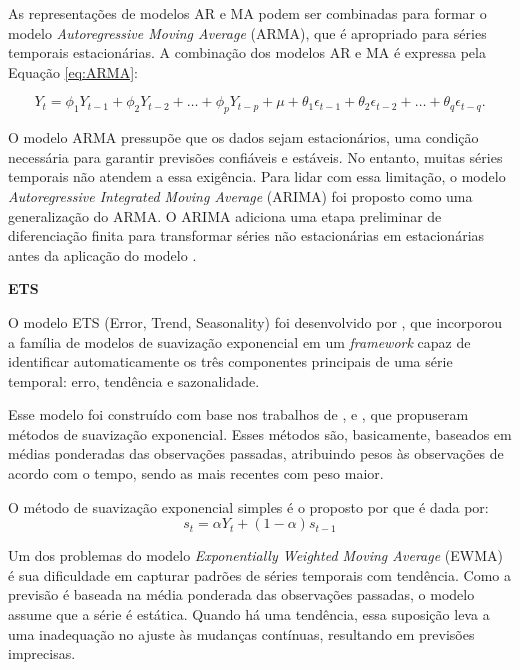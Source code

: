 As representações de modelos AR e MA podem ser combinadas para formar o modelo \textit{Autoregressive Moving Average} (ARMA), que é apropriado para séries temporais estacionárias. A combinação dos modelos AR e MA é expressa pela Equação \eqref{eq:ARMA}:

\begin{equation}
Y_t = \phi_1 Y_{t-1} + \phi_2 Y_{t-2} + \dots + \phi_p Y_{t-p} +  \mu  + \theta_1 \epsilon_{t-1} + \theta_2 \epsilon_{t-2} + \dots + \theta_q \epsilon_{t-q}.
\label{eq:ARMA}
\end{equation}

O modelo ARMA pressupõe que os dados sejam estacionários, uma condição necessária para garantir previsões confiáveis e estáveis. No entanto, muitas séries temporais não atendem a essa exigência. Para lidar com essa limitação, o modelo \textit{Autoregressive Integrated Moving Average} (ARIMA) foi proposto como uma generalização do ARMA. O ARIMA adiciona uma etapa preliminar de diferenciação finita para transformar séries não estacionárias em estacionárias antes da aplicação do modelo \citep{ratnadip2013}.

\textbf{ETS}

O modelo ETS (Error, Trend, Seasonality) foi desenvolvido por \cite{hyndmanETS2008}, que incorporou a família de modelos de suavização exponencial em um \textit{framework} capaz de identificar automaticamente os três componentes principais de uma série temporal: erro, tendência e sazonalidade.

Esse modelo foi construído com base nos trabalhos de \cite{brownETS}, \cite{holtETS} e \cite{wintersETS}, que propuseram métodos de suavização exponencial. Esses métodos são, basicamente, baseados em médias ponderadas das observações passadas, atribuindo pesos às observações de acordo com o tempo, sendo as mais recentes com peso maior.

O método de suavização exponencial simples é o proposto por \cite{brownETS} que é dada por:
\begin{equation}
s_t = \alpha Y_t + (1 - \alpha) s_{t-1}
\end{equation}

Um dos problemas do modelo \textit{Exponentially Weighted Moving Average} (EWMA) é sua dificuldade em capturar padrões de séries temporais com tendência. Como a previsão é baseada na média ponderada das observações passadas, o modelo assume que a série é estática. Quando há uma tendência, essa suposição leva a uma inadequação no ajuste às mudanças contínuas, resultando em previsões imprecisas.

